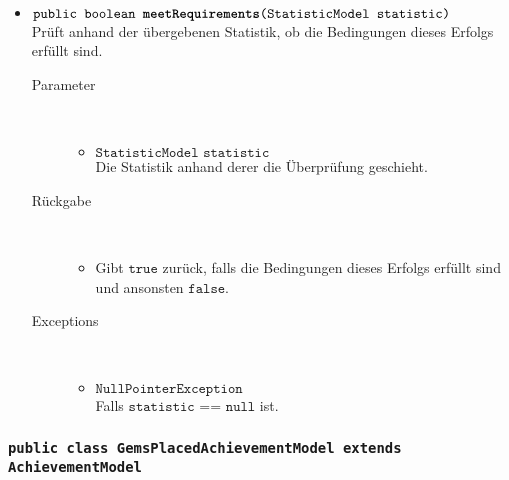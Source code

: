 \begin{description}
\begin{itemize}
				\item $\texttt{public boolean \textbf{meetRequirements}(StatisticModel statistic)}$ \\ Prüft anhand der übergebenen Statistik, ob die Bedingungen dieses Erfolgs erfüllt sind.
				\begin{description}
				\item[Parameter] \hfill \\
					\vspace{-.8cm}
					\begin{itemize}
						\item $\texttt{StatisticModel statistic}$ \\ Die Statistik anhand derer die Überprüfung geschieht. 
					\end{itemize}
					\item[Rückgabe] \hfill \\
					\vspace{-.8cm}
					\begin{itemize}
						\item Gibt $\texttt{true}$ zurück, falls die Bedingungen dieses Erfolgs erfüllt sind und ansonsten $\texttt{false}$.
					\end{itemize}
					\item[Exceptions] \hfill \\
					\vspace{-.8cm}
					\begin{itemize}
						\item $\texttt{NullPointerException}$ \\ Falls $\texttt{statistic == null}$ ist.
					\end{itemize}
				\end{description}
				
			\end{itemize}
		\end{description}
		
		\subsubsection{\normalfont \texttt{public class \textbf{GemsPlacedAchievementModel} extends AchievementModel}}
		
